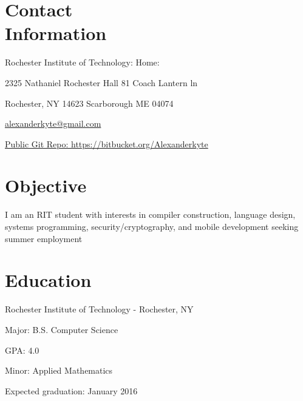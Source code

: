 \documentclass[letter,margin,line]{resume}
\begin{document}
\begin{resume}
\section{\mysidestyle Contact \\ Information} \vspace{2mm}
	\begin{asparablank}
		\item Rochester Institute of Technology: \hfill Home: \hfill
		\item 2325 Nathaniel Rochester Hall \hfill 81 Coach Lantern ln \hfill
		\item Rochester, NY 14623 \hfill Scarborough ME 04074 \hfill
		\\		
		\item\href{mailto:alexanderkyte@gmail.com}{alexanderkyte@gmail.com} \hfill
		\item\href{https://bitbucket.org/Alexanderkyte}{Public Git Repo: https://bitbucket.org/Alexanderkyte} 
	\end{asparablank}

\section{\mysidestyle Objective} \vspace{2mm}
	\begin{asparablank} 
	\item I am an RIT student with interests in compiler construction, language design, systems programming, security/cryptography, and mobile development seeking summer employment 
	 \end{asparablank}

\section{\mysidestyle Education}
	\begin{compactdesc}
		\item[Rochester Institute of Technology] - Rochester, NY 
		\begin{compactitem} { \small
			\item Major: B.S. Computer Science
			\item GPA: 4.0
			\item Minor: Applied Mathematics
			\item Expected graduation: January 2016
		} \end{compactitem}
	\end{compactdesc}


\end{resume}
\end{document}
